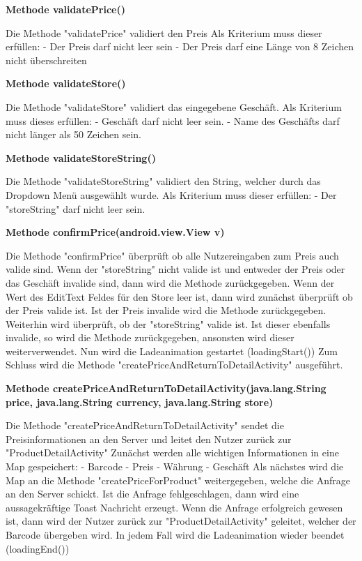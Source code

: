 \documentclass{scrartcl}
\begin{document}
\noindent\textbf{Methode validatePrice()}

\noindent Die Methode "validatePrice" validiert den Preis Als Kriterium muss dieser erfüllen: - Der Preis darf nicht leer sein - Der Preis darf eine Länge von 8 Zeichen nicht überschreiten \newline 

\noindent\textbf{Methode validateStore()}

\noindent Die Methode "validateStore" validiert das eingegebene Geschäft. Als Kriterium muss dieses erfüllen: - Geschäft darf nicht leer sein. - Name des Geschäfts darf nicht länger als 50 Zeichen sein. \newline 

\noindent\textbf{Methode validateStoreString()}

\noindent Die Methode "validateStoreString" validiert den String, welcher durch das Dropdown Menü ausgewählt wurde. Als Kriterium muss dieser erfüllen: - Der "storeString" darf nicht leer sein. \newline 

\noindent\textbf{Methode confirmPrice(android.view.View v)}

\noindent Die Methode "confirmPrice" überprüft ob alle Nutzereingaben zum Preis auch valide sind. Wenn der "storeString" nicht valide ist und entweder der Preis oder das Geschäft invalide sind, dann wird die Methode zurückgegeben. Wenn der Wert des EditText Feldes für den Store leer ist, dann wird zunächst überprüft ob der Preis valide ist. Ist der Preis invalide wird die Methode zurückgegeben. Weiterhin wird überprüft, ob der "storeString" valide ist. Ist dieser ebenfalls invalide, so wird die Methode zurückgegeben, ansonsten wird dieser weiterverwendet. Nun wird die Ladeanimation gestartet (loadingStart()) Zum Schluss wird die Methode "createPriceAndReturnToDetailActivity" ausgeführt. \newline 

\noindent\textbf{Methode createPriceAndReturnToDetailActivity(java.lang.String price, \newline java.lang.String currency,                                                java.lang.String store)}

\noindent Die Methode "createPriceAndReturnToDetailActivity" sendet die Preisinformationen an den Server und leitet den Nutzer zurück zur "ProductDetailActivity" Zunächst werden alle wichtigen Informationen in eine Map gespeichert: - Barcode - Preis - Währung - Geschäft Als nächstes wird die Map an die Methode "createPriceForProduct" weitergegeben, welche die Anfrage an den Server schickt. Ist die Anfrage fehlgeschlagen, dann wird eine aussagekräftige Toast Nachricht erzeugt. Wenn die Anfrage erfolgreich gewesen ist, dann wird der Nutzer zurück zur "ProductDetailActivity" geleitet, welcher der Barcode übergeben wird. In jedem Fall wird die Ladeanimation wieder beendet (loadingEnd()) \newline 
\end{document}
